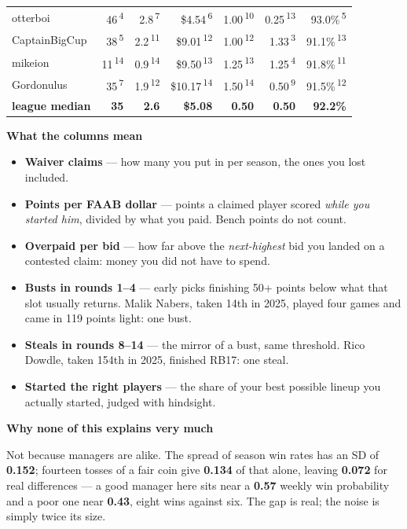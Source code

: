 \documentclass[10pt]{article}
\newcommand{\rk}[1]{\textsuperscript{\textcolor{muted}{\scriptsize #1}}}
\begin{document}
\begin{tabular}{l*{6}{r}}
otterboi & 46\,\rk{4} & 2.8\,\rk{7} & \$4.54\,\rk{6} & 1.00\,\rk{10} & 0.25\,\rk{13} & 93.0\%\,\rk{5} \\
CaptainBigCup & 38\,\rk{5} & 2.2\,\rk{11} & \$9.01\,\rk{12} & 1.00\,\rk{12} & 1.33\,\rk{3} & 91.1\%\,\rk{13} \\
mikeion & 11\,\rk{14} & 0.9\,\rk{14} & \$9.50\,\rk{13} & 1.25\,\rk{13} & 1.25\,\rk{4} & 91.8\%\,\rk{11} \\
Gordonulus & 35\,\rk{7} & 1.9\,\rk{12} & \$10.17\,\rk{14} & 1.50\,\rk{14} & 0.50\,\rk{9} & 91.5\%\,\rk{12} \\
\midrule
\textbf{league median} & \textbf{35} & \textbf{2.6} & \textbf{\$5.08} & \textbf{0.50} & \textbf{0.50} & \textbf{92.2\%} \\
\bottomrule
\end{tabular}

\vspace{11pt}
{\large\bfseries What the columns mean}

\vspace{6pt}
\begin{itemize}[leftmargin=1.4em,itemsep=2.5pt,topsep=0pt]
\item \textbf{Waiver claims} --- how many you put in per season, the ones you lost
      included.
\item \textbf{Points per FAAB dollar} --- points a claimed player scored \emph{while
      you started him}, divided by what you paid. Bench points do not count.
\item \textbf{Overpaid per bid} --- how far above the \emph{next-highest} bid you
      landed on a contested claim: money you did not have to spend.
\item \textbf{Busts in rounds 1--4} --- early picks finishing 50+ points below what
      that slot usually returns. Malik Nabers, taken 14th in 2025, played four
      games and came in 119 points light: one bust.
\item \textbf{Steals in rounds 8--14} --- the mirror of a bust, same threshold. Rico
      Dowdle, taken 154th in 2025, finished RB17: one steal.
\item \textbf{Started the right players} --- the share of your best possible lineup
      you actually started, judged with hindsight.
\end{itemize}

\vspace{11pt}
{\large\bfseries Why none of this explains very much}

\vspace{6pt}
Not because managers are alike. The spread of season win rates has an SD of
\textbf{0.152}; fourteen tosses of a fair coin give \textbf{0.134} of that
alone, leaving \textbf{0.072} for real differences --- a good manager here sits
near a \textbf{0.57} weekly win probability and a poor one near \textbf{0.43},
eight wins against six. The gap is real; the noise is simply twice its size.
\end{document}
